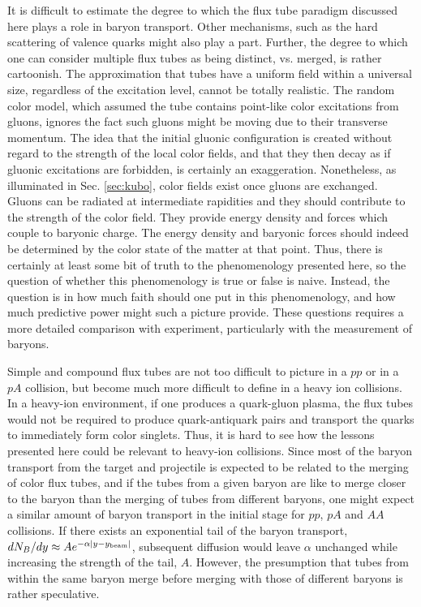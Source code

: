 \documentclass[aps, prc, 12pt, nofootinbib, showpacs, superscriptaddress, tightenlines, groupedaddress]{revtex4-2}
\begin{document}
It is difficult to estimate the degree to which the flux tube paradigm discussed here plays a role in baryon transport. Other mechanisms, such as the hard scattering of valence quarks might also play a part. Further, the degree to which one can consider multiple flux tubes as being distinct, vs. merged, is rather cartoonish. The approximation that tubes have a uniform field within a universal size, regardless of the excitation level, cannot be totally realistic. The random color model, which assumed the tube contains point-like color excitations from gluons, ignores the fact such gluons might be moving due to their transverse momentum. The idea that the initial gluonic configuration is created without regard to the strength of the local color fields, and that they then decay as if gluonic excitations are forbidden, is certainly an exaggeration.  Nonetheless, as illuminated in Sec. \ref{sec:kubo}, color fields exist once gluons are exchanged. Gluons can be radiated at intermediate rapidities and they should contribute to the strength of the color field. They provide energy density and forces which couple to baryonic charge. The energy density and baryonic forces should indeed be determined by the color state of the matter at that point. Thus, there is certainly at least some bit of truth to the phenomenology presented here, so the question of whether this phenomenology is true or false is naive. Instead, the question is in how much faith should one put in this phenomenology, and how much predictive power might such a picture provide. These questions requires a more detailed comparison with experiment, particularly with the measurement of baryons. 

Simple and compound flux tubes are not too difficult to picture in a $pp$ or in a $pA$ collision, but become much more difficult to define in a heavy ion collisions. In a heavy-ion environment, if one produces a quark-gluon plasma, the flux tubes would not be required to produce quark-antiquark pairs and transport the quarks to immediately form color singlets. Thus, it is hard to see how the lessons presented here could be relevant to heavy-ion collisions. Since most of the baryon transport from the target and projectile is expected to be related to the merging of color flux tubes, and if the tubes from a given baryon are like to merge closer to the baryon than the merging of tubes from different baryons, one might expect a similar amount of baryon transport in the initial stage for $pp$, $pA$ and $AA$ collisions. If there exists an exponential tail of the baryon transport, $dN_B/dy \approx Ae^{-\alpha|y-y_{\rm beam}|}$, subsequent diffusion would leave $\alpha$ unchanged while increasing the strength of the tail, $A$. However, the presumption that tubes from within the same baryon merge before merging with those of different baryons is rather speculative. 
\end{document}
